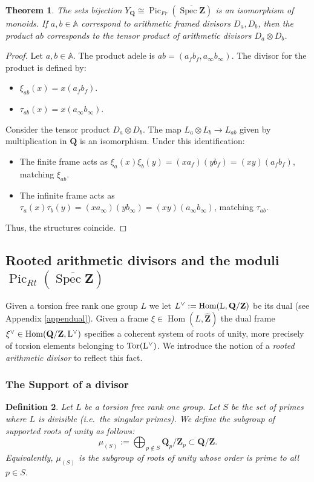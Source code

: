 \documentclass[11pt,a4paper]{article}
\newcommand{\Q}{\mathbf{Q}}
\newcommand{\Z}{\mathbf{Z}}
\newcommand{\A}{\mathbb{A}}
\def\Hom{\rm{Hom}}
\def\spzb{\overline{\Spec \Z}}
\newcommand{\Spec}{\operatorname{Spec}}
\def\MFr{\operatorname{Pic}_{Fr}}
\def\MRt{\operatorname{Pic}_{Rt}}
\def\ie{{\it i.e.\/}\ }
\theoremstyle{plain}
\newtheorem{thm}{Theorem}[section]
\newtheorem{defn}[thm]{Definition}
\theoremstyle{definition} %
\begin{document}
\begin{thm}
The sets bijection $Y_\Q \cong \MFr(\spzb)$ is an isomorphism of monoids.
If $a, b \in \A$ correspond to arithmetic framed divisors $D_a, D_b$, then the product $ab$ corresponds to the tensor product of arithmetic divisors $D_a \otimes D_b$.
\end{thm}

\begin{proof}
Let $a, b \in \A$.
The product adele is $ab = (a_f b_f, a_\infty b_\infty)$.
The divisor for the product is defined by:
\begin{itemize}[leftmargin=*, labelindent=0pt]
    \item[] $\xi_{ab}(x) = x (a_f b_f)$.
    \item[] $\tau_{ab}(x) = x (a_\infty b_\infty)$.
\end{itemize}
Consider the tensor product $D_a \otimes D_b$.
The map $L_a \otimes L_b \to L_{ab}$ given by multiplication in $\Q$ is an isomorphism.
Under this identification:
\begin{itemize}[leftmargin=*, labelindent=0pt]
    \item[] The finite frame acts as $\xi_a(x) \xi_b(y) = (x a_f)(y b_f) = (xy) (a_f b_f)$, matching $\xi_{ab}$.
    \item[] The infinite frame acts as $\tau_a(x) \tau_b(y) = (x a_\infty)(y b_\infty) = (xy) (a_\infty b_\infty)$, matching $\tau_{ab}$.
\end{itemize}
Thus, the structures coincide.
\end{proof}
\subsection{Rooted arithmetic divisors and the moduli $\MRt(\spzb)$}

 Given a torsion free rank one group $L$ we let $L^\vee:= \Hom(L,\Q/\Z)$ be its dual (see Appendix \ref{appendual}). Given   a frame $\xi \in \operatorname{Hom}(L, \widehat{\Z})$ the dual frame   $\xi^\vee\in \Hom(\Q/\Z,L^\vee)$ specifies a coherent system of roots of unity, more precisely of torsion elements belonging to $\rm{Tor}(L^\vee)$. 
We introduce the notion of a \emph{rooted arithmetic divisor} to  reflect this fact.

\subsubsection{The Support of a divisor}

\begin{defn}
Let $L$ be a torsion free rank one group. Let $S$ be the set of primes where $L$ is divisible (\ie the \emph{singular} primes). 
We define the subgroup of supported roots of unity as follows:
\[
\mu_{(S)} := \bigoplus_{p \notin S} \Q_p/\Z_p \subset \Q/\Z.
\]
Equivalently, $\mu_{(S)}$ is the subgroup of roots of unity whose order is prime to all $p \in S$.
\end{defn}
\end{document}
